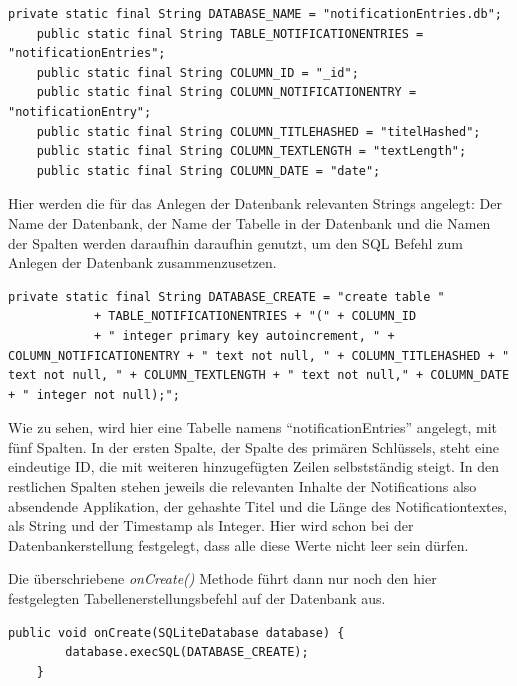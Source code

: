 \begin{lstlisting}[frame=single, caption = Datenbank Strings, label=databasestrings] 
    private static final String DATABASE_NAME = "notificationEntries.db";
    public static final String TABLE_NOTIFICATIONENTRIES = "notificationEntries"; 
    public static final String COLUMN_ID = "_id";
    public static final String COLUMN_NOTIFICATIONENTRY = "notificationEntry";
    public static final String COLUMN_TITLEHASHED = "titelHashed";
    public static final String COLUMN_TEXTLENGTH = "textLength";
    public static final String COLUMN_DATE = "date";
\end{lstlisting}

Hier werden die für das Anlegen der Datenbank relevanten Strings angelegt:
Der Name der Datenbank, der Name der Tabelle in der Datenbank und die Namen der Spalten werden daraufhin daraufhin genutzt, um den SQL Befehl zum Anlegen der Datenbank zusammenzusetzen.

\begin{lstlisting}[frame=single, caption = Datenbank Creation String, label=databasecreation] 
    private static final String DATABASE_CREATE = "create table "
            + TABLE_NOTIFICATIONENTRIES + "(" + COLUMN_ID
            + " integer primary key autoincrement, " + COLUMN_NOTIFICATIONENTRY + " text not null, " + COLUMN_TITLEHASHED + " text not null, " + COLUMN_TEXTLENGTH + " text not null," + COLUMN_DATE + " integer not null);";

\end{lstlisting}

Wie zu sehen, wird hier eine Tabelle namens "`notificationEntries"' angelegt, mit fünf Spalten.
In der ersten Spalte, der Spalte des primären Schlüssels, steht eine eindeutige ID, die mit weiteren hinzugefügten Zeilen selbstständig steigt.
In den restlichen Spalten stehen jeweils die relevanten Inhalte der Notifications also absendende Applikation, der gehashte Titel und die Länge des Notificationtextes, als String und der Timestamp als Integer. 
Hier wird schon bei der Datenbankerstellung festgelegt, dass alle diese Werte nicht leer sein dürfen.

Die überschriebene \emph{onCreate()} Methode führt dann nur noch den hier festgelegten Tabellenerstellungsbefehl auf der Datenbank aus.

\begin{lstlisting}[frame=single, caption = onCreate Methode, label=databaseoncreate] 
  public void onCreate(SQLiteDatabase database) {
        database.execSQL(DATABASE_CREATE);
    } 
\end{lstlisting}

